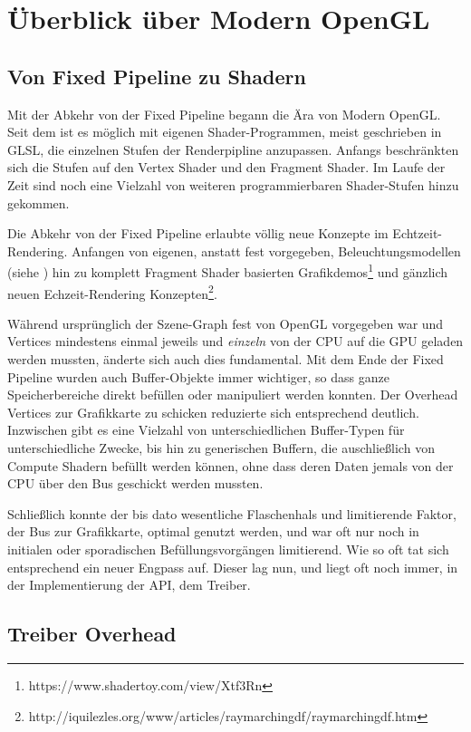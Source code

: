 \chapter{Überblick über Modern OpenGL}
\label{cha:modern-opengl}

\section{Von Fixed Pipeline zu Shadern}
Mit der Abkehr von der Fixed Pipeline begann die Ära von Modern OpenGL. Seit dem ist es möglich mit eigenen Shader-Programmen, meist geschrieben in GLSL, die einzelnen Stufen der Renderpipline anzupassen. Anfangs beschränkten sich die Stufen auf den Vertex Shader und den Fragment Shader. Im Laufe der Zeit sind noch eine Vielzahl von weiteren programmierbaren Shader-Stufen hinzu gekommen.

Die Abkehr von der Fixed Pipeline erlaubte völlig neue Konzepte im Echtzeit-Rendering. Anfangen von eigenen, anstatt fest vorgegeben, Beleuchtungsmodellen (siehe ) hin zu komplett Fragment Shader basierten Grafikdemos\footnote{https://www.shadertoy.com/view/Xtf3Rn} und gänzlich neuen Echzeit-Rendering Konzepten\footnote{http://iquilezles.org/www/articles/raymarchingdf/raymarchingdf.htm}.

Während ursprünglich der Szene-Graph fest von OpenGL vorgegeben war und Vertices mindestens einmal jeweils und \textit{einzeln} von der CPU auf die GPU geladen werden mussten, änderte sich auch dies fundamental. Mit dem Ende der Fixed Pipeline wurden auch Buffer-Objekte immer wichtiger, so dass ganze Speicherbereiche direkt befüllen oder manipuliert werden konnten. Der Overhead Vertices zur Grafikkarte zu schicken reduzierte sich entsprechend deutlich. Inzwischen gibt es eine Vielzahl von unterschiedlichen Buffer-Typen für unterschiedliche Zwecke, bis hin zu generischen Buffern, die auschließlich von Compute Shadern befüllt werden können, ohne dass deren Daten jemals von der CPU über den Bus geschickt werden mussten.

Schließlich konnte der bis dato wesentliche Flaschenhals und limitierende Faktor, der Bus zur Grafikkarte, optimal genutzt werden, und war oft nur noch in initialen oder sporadischen Befüllungsvorgängen limitierend. Wie so oft tat sich entsprechend ein neuer Engpass auf. Dieser lag nun, und liegt oft noch immer, in der Implementierung der API, dem Treiber.

\section{Treiber Overhead}

